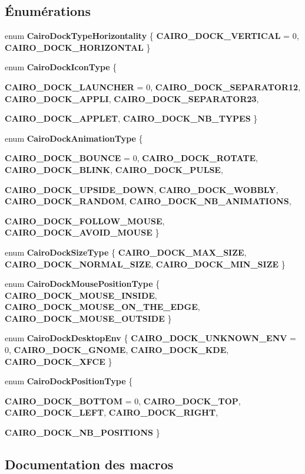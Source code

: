 \subsection*{Énumérations}
\begin{CompactItemize}
\item 
enum {\bf CairoDockTypeHorizontality} \{ {\bf CAIRO\_\-DOCK\_\-VERTICAL} =  0, 
{\bf CAIRO\_\-DOCK\_\-HORIZONTAL}
 \}
\item 
enum {\bf CairoDockIconType} \{ \par
{\bf CAIRO\_\-DOCK\_\-LAUNCHER} =  0, 
{\bf CAIRO\_\-DOCK\_\-SEPARATOR12}, 
{\bf CAIRO\_\-DOCK\_\-APPLI}, 
{\bf CAIRO\_\-DOCK\_\-SEPARATOR23}, 
\par
{\bf CAIRO\_\-DOCK\_\-APPLET}, 
{\bf CAIRO\_\-DOCK\_\-NB\_\-TYPES}
 \}
\item 
enum {\bf CairoDockAnimationType} \{ \par
{\bf CAIRO\_\-DOCK\_\-BOUNCE} =  0, 
{\bf CAIRO\_\-DOCK\_\-ROTATE}, 
{\bf CAIRO\_\-DOCK\_\-BLINK}, 
{\bf CAIRO\_\-DOCK\_\-PULSE}, 
\par
{\bf CAIRO\_\-DOCK\_\-UPSIDE\_\-DOWN}, 
{\bf CAIRO\_\-DOCK\_\-WOBBLY}, 
{\bf CAIRO\_\-DOCK\_\-RANDOM}, 
{\bf CAIRO\_\-DOCK\_\-NB\_\-ANIMATIONS}, 
\par
{\bf CAIRO\_\-DOCK\_\-FOLLOW\_\-MOUSE}, 
{\bf CAIRO\_\-DOCK\_\-AVOID\_\-MOUSE}
 \}
\item 
enum {\bf CairoDockSizeType} \{ {\bf CAIRO\_\-DOCK\_\-MAX\_\-SIZE}, 
{\bf CAIRO\_\-DOCK\_\-NORMAL\_\-SIZE}, 
{\bf CAIRO\_\-DOCK\_\-MIN\_\-SIZE}
 \}
\item 
enum {\bf CairoDockMousePositionType} \{ {\bf CAIRO\_\-DOCK\_\-MOUSE\_\-INSIDE}, 
{\bf CAIRO\_\-DOCK\_\-MOUSE\_\-ON\_\-THE\_\-EDGE}, 
{\bf CAIRO\_\-DOCK\_\-MOUSE\_\-OUTSIDE}
 \}
\item 
enum {\bf CairoDockDesktopEnv} \{ {\bf CAIRO\_\-DOCK\_\-UNKNOWN\_\-ENV} = 0, 
{\bf CAIRO\_\-DOCK\_\-GNOME}, 
{\bf CAIRO\_\-DOCK\_\-KDE}, 
{\bf CAIRO\_\-DOCK\_\-XFCE}
 \}
\item 
enum {\bf CairoDockPositionType} \{ \par
{\bf CAIRO\_\-DOCK\_\-BOTTOM} =  0, 
{\bf CAIRO\_\-DOCK\_\-TOP}, 
{\bf CAIRO\_\-DOCK\_\-LEFT}, 
{\bf CAIRO\_\-DOCK\_\-RIGHT}, 
\par
{\bf CAIRO\_\-DOCK\_\-NB\_\-POSITIONS}
 \}
\end{CompactItemize}


\subsection{Documentation des macros}
